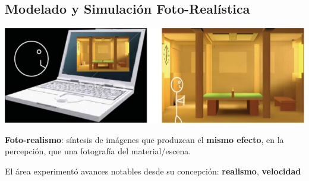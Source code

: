 \documentclass[spanish,unknownkeysallowed,10pt]{beamer}
\begin{document}
\subsection{Modelado y Simulación Foto-Realística}
\begin{frame}{}

\centerline{\includegraphics[scale = 0.2]{../figures/fotorealismo}}

\textbf{Foto-realismo}: síntesis de imágenes que produzcan el \textbf{mismo efecto}, en la percepción, que una fotografía del material/escena.

\vspace{0.2cm}

El área experimentó avances notables desde su concepción: \textbf{realismo}, \textbf{velocidad}




\end{frame}
\end{document}
